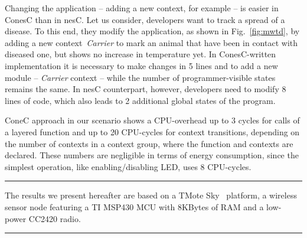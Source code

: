 Changing the application -- adding a new context, for example -- is easier in
ConesC than in nesC. Let us consider, developers want to track a spread of a
disease. To this end, they modify the application, as shown in Fig.~\ref{fig:mwtd},
by adding a new context~\emph{Carrier} to mark an animal that have been in
contact with diseased one, but shows no increase in temperature yet. In
ConesC-written implementation it is necessary to make changes in 5 lines and
to add a new module -- \emph{Carrier} context -- while the number of
programmer-visible states remains the same. In nesC counterpart, however,
developers need to modify 8 lines of code, which also leads to 2 additional
global states of the program.



ConeC approach in our scenario shows a CPU-overhead up to 3 cycles for calls of
a layered function and up to 20 CPU-cycles for context transitions, depending on
the number of contexts in a context group, where the function and contexts are
declared. These numbers are negligible in terms of energy consumption, since the
simplest operation, like enabling/disabling LED, uses 8 CPU-cycles.

\hrule
The results we present hereafter are based on a TMote
Sky~\cite{} platform, a wireless sensor node featuring a TI MSP430 MCU
with 8KBytes of RAM and a low-power CC2420 radio.
\hrule

